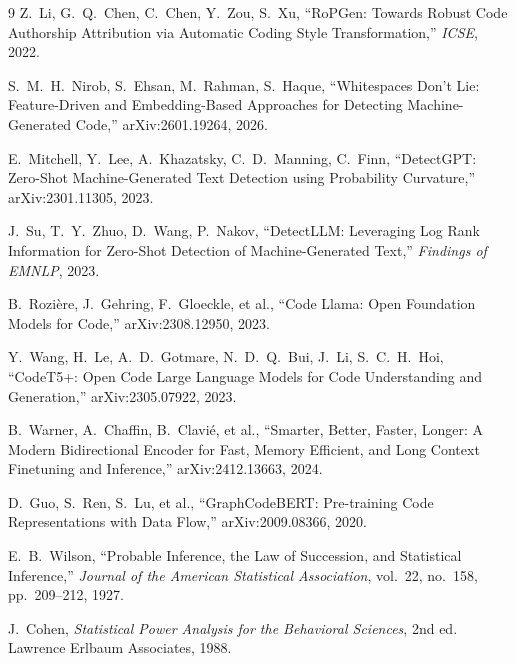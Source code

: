 \documentclass[10pt,conference]{IEEEtran}
\begin{document}
\begin{thebibliography}{9}
 Z.~Li, G.~Q.~Chen, C.~Chen, Y.~Zou, S.~Xu, ``RoPGen: Towards Robust Code Authorship Attribution via Automatic Coding Style Transformation,'' \emph{ICSE}, 2022.

 S.~M.~H.~Nirob, S.~Ehsan, M.~Rahman, S.~Haque, ``Whitespaces Don't Lie: Feature-Driven and Embedding-Based Approaches for Detecting Machine-Generated Code,'' arXiv:2601.19264, 2026.

 E.~Mitchell, Y.~Lee, A.~Khazatsky, C.~D.~Manning, C.~Finn, ``DetectGPT: Zero-Shot Machine-Generated Text Detection using Probability Curvature,'' arXiv:2301.11305, 2023.

 J.~Su, T.~Y.~Zhuo, D.~Wang, P.~Nakov, ``DetectLLM: Leveraging Log Rank Information for Zero-Shot Detection of Machine-Generated Text,'' \emph{Findings of EMNLP}, 2023.

 B.~Rozi\`ere, J.~Gehring, F.~Gloeckle, et al., ``Code Llama: Open Foundation Models for Code,'' arXiv:2308.12950, 2023.

 Y.~Wang, H.~Le, A.~D.~Gotmare, N.~D.~Q.~Bui, J.~Li, S.~C.~H.~Hoi, ``CodeT5+: Open Code Large Language Models for Code Understanding and Generation,'' arXiv:2305.07922, 2023.

 B.~Warner, A.~Chaffin, B.~Clavi\'e, et al., ``Smarter, Better, Faster, Longer: A Modern Bidirectional Encoder for Fast, Memory Efficient, and Long Context Finetuning and Inference,'' arXiv:2412.13663, 2024.

 D.~Guo, S.~Ren, S.~Lu, et al., ``GraphCodeBERT: Pre-training Code Representations with Data Flow,'' arXiv:2009.08366, 2020.

 E.~B.~Wilson, ``Probable Inference, the Law of Succession, and Statistical Inference,'' \emph{Journal of the American Statistical Association}, vol.~22, no.~158, pp.~209--212, 1927.

 J.~Cohen, \emph{Statistical Power Analysis for the Behavioral Sciences}, 2nd ed. Lawrence Erlbaum Associates, 1988.

\end{thebibliography}
\end{document}
